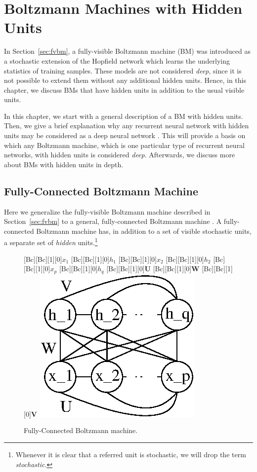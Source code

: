 \documentclass[dissertation,nocontribution]{aaltoseries}
\newcommand{\matr}[1]{\mathbf{#1}}
\newcommand{\mW}[0]{\matr{W}}
\newcommand{\mU}[0]{\matr{U}}
\newcommand{\mV}[0]{\matr{V}}
\begin{document}
\chapter{Boltzmann Machines with Hidden Units}
\label{chap:bm}

In Section~\ref{sec:fvbm}, a fully-visible Boltzmann machine
(BM) was introduced as a
stochastic extension of the Hopfield network which learns
the underlying statistics of training samples. These models
are not considered \textit{deep}, since it is not possible
to extend them without any additional hidden units. Hence,
in this chapter, we discuss BMs that have hidden units in
addition to the usual visible units.

In this chapter, we start with a general description of a BM
with hidden units. Then, we give  a brief explanation why
any recurrent neural network with hidden units may be
considered as a deep neural network \citep[see,
e.g.,][]{Bengio2013rec}. This will provide a basis on which
any Boltzmann machine, which is one particular type of
recurrent neural networks, with hidden units is considered
\textit{deep}. Afterwards, we discuss more about BMs with
hidden units in depth.

\section{Fully-Connected Boltzmann Machine}
\label{sec:fbm}

Here we generalize the fully-visible Boltzmann machine
described in Section~\ref{sec:fvbm} to a general,
fully-connected Boltzmann machine \citep{Ackley1985}.  A
fully-connected Boltzmann machine has, in addition to a set
of visible stochastic units, a separate set of
\textit{hidden} units.\footnote{Whenever it is clear that a
referred unit is stochastic, we will drop the term
\textit{stochastic}.} 

\begin{figure}
    \centering
    [Bc][Bc][1][0]{$x_1$}
    [Bc][Bc][1][0]{$h_1$}
    [Bc][Bc][1][0]{$x_2$}
    [Bc][Bc][1][0]{$h_2$}
    [Bc][Bc][1][0]{$x_p$}
    [Bc][Bc][1][0]{$h_q$}
    [Bc][Bc][1][0]{$\mU$}
    [Bc][Bc][1][0]{$\mW$}
    [Bc][Bc][1][0]{$\mV$}
    \includegraphics[width=0.4\columnwidth]{figures/fbm.eps}
    \caption{Fully-Connected Boltzmann machine.}
    \label{fig:fbm}
\end{figure}
\end{document}
